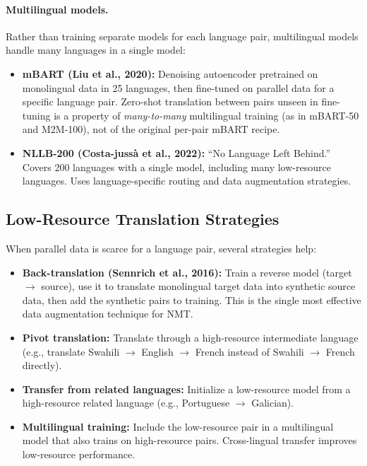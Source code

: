 \paragraph{Multilingual models.}
Rather than training separate models for each language pair, multilingual models handle
many languages in a single model:
\begin{itemize}
    \item \textbf{mBART (Liu et al., 2020):} Denoising autoencoder pretrained on monolingual
          data in 25 languages, then fine-tuned on parallel data for a specific language
          pair.  Zero-shot translation between pairs unseen in fine-tuning is a property of
          \emph{many-to-many} multilingual training (as in mBART-50 and M2M-100), not of the
          original per-pair mBART recipe.
    \item \textbf{NLLB-200 (Costa-juss\`{a} et al., 2022):} ``No Language Left Behind.''
          Covers 200 languages with a single model, including many low-resource languages.
          Uses language-specific routing and data augmentation strategies.
\end{itemize}

\subsection{Low-Resource Translation Strategies}

When parallel data is scarce for a language pair, several strategies help:

\begin{itemize}
    \item \textbf{Back-translation (Sennrich et al., 2016):} Train a reverse model
          (target $\to$ source), use it to translate monolingual target data into synthetic
          source data, then add the synthetic pairs to training.  This is the single most
          effective data augmentation technique for NMT.
    \item \textbf{Pivot translation:} Translate through a high-resource intermediate language
          (e.g., translate Swahili $\to$ English $\to$ French instead of Swahili $\to$
          French directly).
    \item \textbf{Transfer from related languages:} Initialize a low-resource model from a
          high-resource related language (e.g., Portuguese $\to$ Galician).
    \item \textbf{Multilingual training:} Include the low-resource pair in a multilingual
          model that also trains on high-resource pairs.  Cross-lingual transfer improves
          low-resource performance.
\end{itemize}

